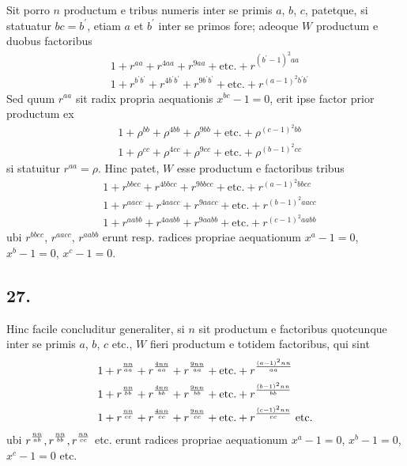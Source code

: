 \documentclass[twoside,12pt]{memoir}
\let\oldfrac\frac
\def\frac#1#2{\mathchoice{\tfrac{#1}{#2}}{\oldfrac{#1}{#2}}{\genfrac{}{}{}{2}{#1}{#2\mathstrut}}{\genfrac{}{}{}{3}{#1}{#2\mathstrut}}}
\begin{document}
Sit porro \(n\) productum e tribus numeris inter se primis \(a\), \(b\), \(c\), patetque, si statuatur \(b c=b^{\prime}\), etiam \(a\) et \(b^{\prime}\) inter se primos fore; adeoque \(W\) productum e duobus factoribus
\[\begin{aligned}
& 1+r^{a a}+r^{4 a a}+r^{9 a a}+\text{etc.}+r^{(b^{\prime}-1)^{2} a a} \\
& 1+r^{b^{\prime} b^{\prime}}+r^{4 b^{\prime} b^{\prime}}+r^{9 b^{\prime} b^{\prime}}+\text{etc.}+r^{(a-1)^{2} b^{\prime} b^{\prime}}
\end{aligned}\]
Sed quum \(r^{a a}\) sit radix propria aequationis \(x^{b c}-1=0\), erit ipse factor prior productum ex
\[\begin{aligned}
& 1+\rho^{b b}+\rho^{4 b b}+\rho^{9 b b}+\text{etc.}+\rho^{(c-1)^{2} b b} \\
& 1+\rho^{c c}+\rho^{4 c c}+\rho^{9 c c}+\text{etc.}+\rho^{(b-1)^{2} c c}
\end{aligned}\]
si statuitur \(r^{a a}=\rho\). Hinc patet, \(W\) esse productum e factoribus tribus
\[\begin{aligned}
& 1+r^{b b c c}+r^{4 b b c c}+r^{9 b b c c}+\text{etc.}+r^{(a-1)^{2} b b c c} \\
& 1+r^{a a c c}+r^{4 a a c c}+r^{9 a a c c}+\text{etc.}+r^{(b-1)^{2} a a c c} \\
& 1+r^{a a b b}+r^{4 a a b b}+r^{9 a a b b}+\text{etc.}+r^{(c-1)^{2} a a b b}
\end{aligned}\]
ubi \(r^{b b c c}\), \(r^{a a c c}\), \(r^{a a b b}\) erunt resp. radices propriae aequationum \(x^{a}-1=0\), \(x^{b}-1=0\), \(x^{c}-1=0\).

\subsection*{27.}
 
Hinc facile concluditur generaliter, si \(n\) sit productum e factoribus quotcunque inter se primis \(a\), \(b\), \(c\) etc., \(W\) fieri productum e totidem factoribus, qui sint
\[\begin{aligned}
& 1+r^{\frac{n n}{a a}}+r^{\frac{4 n n}{a a}}+r^{\frac{9 n n}{a a}}+\text{etc.}+r^{\frac{(a-1)^{2} n n}{a a}} \\
& 1+r^{\frac{n n}{b b}}+r^{\frac{4 n n}{b b}}+r^{\frac{9 n n}{b b}}+\text{etc.}+r^{\frac{(b-1)^{2} n n}{b b}} \\
& 1+r^{\frac{n n}{c c}}+r^{\frac{4 n n}{c c}}+r^{\frac{9 n n}{c c}}+\text{etc.}+r^{\frac{(c-1)^{2} n n}{c c}} \text{ etc.}
\end{aligned}\]
ubi \(r^{\frac{n n}{a b}}, r^{\frac{n n}{b b}}, r^{\frac{n n}{c c}}\) etc. erunt radices propriae aequationum \(x^{a}-1=0\), \(x^{b}-1=0\), \(x^{c}-1=0\) etc.
\end{document}
